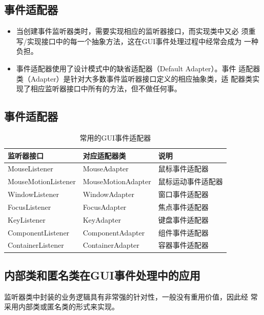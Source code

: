 \subsection{事件适配器}

\begin{itemize}
\item 当创建事件监听器类时，需要实现相应的监听器接口，而实现类中又必
  须重写/实现接口中的每一个抽象方法，这在GUI事件处理过程中经常会成为
  一种负担。
\item 事件适配器使用了设计模式中的缺省适配器（Default Adapter）。事件
  适配器类（Adapter）是针对大多数事件监听器接口定义的相应抽象类，适
  配器类实现了相应监听器接口中所有的方法，但不做任何事。
\end{itemize}


\subsection{事件适配器}

\begin{table}[!htbp]
  \centering
  \caption{常用的GUI事件适配器}
  \label{tab:gui-events-adapter}
  \begin{tabular}{l|l|l}
    {\bf 监听器接口} & {\bf 对应适配器类} & {\bf 说明}\\
    \hline
    MouseListener & MouseAdapter & 鼠标事件适配器\\
    MouseMotionListener & MouseMotionAdapter & 鼠标运动事件适配器\\
    WindowListener & WindowAdapter & 窗口事件适配器\\
    FocusListener & FocusAdapter & 焦点事件适配器\\
    KeyListener & KeyAdapter & 键盘事件适配器\\
    ComponentListener & ComponentAdapter & 组件事件适配器\\
    ContainerListener & ContainerAdapter & 容器事件适配器\\
  \end{tabular}
\end{table}


\subsection{内部类和匿名类在GUI事件处理中的应用}

监听器类中封装的业务逻辑具有非常强的针对性，一般没有重用价值，因此经
常采用内部类或匿名类的形式来实现。

